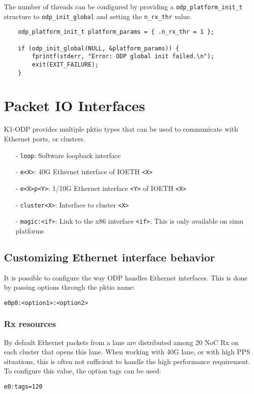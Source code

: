 \documentclass{trkalray}
\begin{document}
The number of threads can be configured by providing a
\texttt{odp\_platform\_init\_t} structure to
\texttt{odp\_init\_global} and setting the \texttt{n\_rx\_thr} value.

\begin{lstlisting}
	odp_platform_init_t platform_params = { .n_rx_thr = 1 };

	if (odp_init_global(NULL, &platform_params)) {
		fprintf(stderr, "Error: ODP global init failed.\n");
		exit(EXIT_FAILURE);
	}
\end{lstlisting}

\section{Packet IO Interfaces}

K1-ODP provides multiple pktio types that can be used to communicate
with Ethernet ports, or clusters.

\begin{itemize}
\item[-]{\texttt{loop}: Software loopback interface}
\item[-]{\texttt{e<X>}: 40G Ethernet interface of IOETH \texttt{<X>}}
\item[-]{\texttt{e<X>p<Y>}: 1/10G Ethernet interface \texttt{<Y>} of
  IOETH \texttt{<X>}}
\item[-]{\texttt{cluster<X>}: Interface to cluster \texttt{<X>}}
\item[-]{\texttt{magic:<if>}: Link to the x86 interface
  \texttt{<if>}. This is only available on simu platforms}
\end{itemize}

\subsection{Customizing Ethernet interface behavior}

It is possible to configure the way ODP handles Ethernet interfaces.
This is done by passing options through the pktio name:
\begin{lstlisting}
e0p0:<option1>:<option2>
\end{lstlisting}

\subsubsection{Rx resources}

By default Ethernet packets from a lane are distributed among 20 NoC Rx on each
cluster that opens this lane.
When working with 40G lane, or with high PPS situations, this is often
not sufficient to handle the high performance requirement.
To configure this value, the option tags can be used:
\begin{lstlisting}
e0:tags=120
\end{lstlisting}
\end{document}
